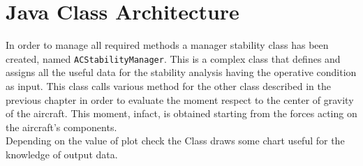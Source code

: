 \section{Java Class Architecture}
In order to manage all required methods a manager stability class has been created, named \texttt{ACStabilityManager}. This is a complex class that defines and assigns all the useful data for the stability analysis having the operative condition as input. This class calls various method for the other class described in the previous chapter in order to evaluate the moment respect to the center of gravity of the aircraft. This moment, infact, is obtained starting from the forces acting on the aircraft's components.\\
Depending on the value of plot check the Class draws some chart useful for the knowledge of output data. 
\noindent \\

